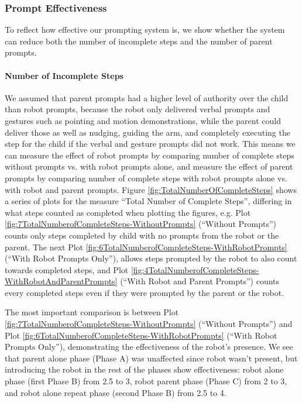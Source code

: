 \subsubsection{Prompt Effectiveness}
To reflect how effective our prompting system is, we show whether the system can reduce both the number of incomplete steps and the number of parent prompts.

\paragraph{Number of Incomplete Steps}
We assumed that parent prompts had a higher level of authority over the child than robot prompts, because the robot only delivered verbal prompts and gestures such as pointing and motion demonstrations, while the parent could deliver those as well as nudging, guiding the arm, and completely executing the step for the child if the verbal and gesture prompts did not work.  This means we can measure the effect of robot prompts by comparing number of complete steps without prompts vs. with robot prompts alone, and measure the effect of parent prompts by comparing number of complete steps with robot prompts alone vs. with robot and parent prompts.  Figure \ref{fig:TotalNumberOfCompleteSteps} shows a series of plots for the measure ``Total Number of Complete Steps'', differing in what steps counted as completed when plotting the figures, e.g. Plot \ref{fig:7TotalNumberofCompleteSteps-WithoutPrompts} (``Without Prompts'') counts only steps completed by child with no prompts from the robot or the parent.  The next Plot \ref{fig:6TotalNumberofCompleteSteps-WithRobotPrompts} (``With Robot Prompts Only''), allows steps prompted by the robot to also count towards completed steps, and Plot \ref{fig:4TotalNumberofCompleteSteps-WithRobotAndParentPrompts} (``With Robot and Parent Prompts'') counts every completed steps even if they were prompted by the parent or the robot.

The most important comparison is between Plot \ref{fig:7TotalNumberofCompleteSteps-WithoutPrompts} (``Without Prompts'') and Plot \ref{fig:6TotalNumberofCompleteSteps-WithRobotPrompts} (``With Robot Prompts Only''), demonstrating the effectiveness of the robot's presence.  We see that parent alone phase (Phase A) was unaffected since robot wasn't present, but introducing the robot in the rest of the phases show effectiveness: robot alone phase (first Phase B) from 2.5 to 3, robot parent phase (Phase C) from 2 to 3, and robot alone repeat phase (second Phase B) from 2.5 to 4.

